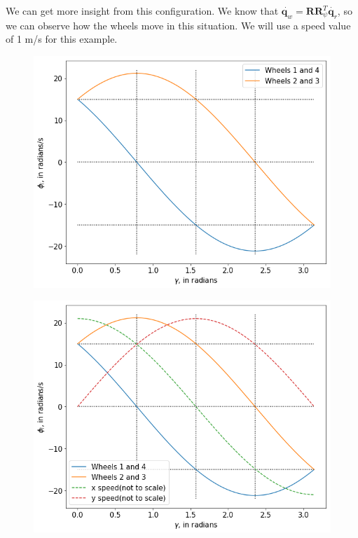\documentclass[12pt]{article}
\renewcommand{\vec}[1]{\bm{#1}}
\newcommand{\R}{\mathbb R}
\def\R{\vec R}
\def\q{\vec q}
\begin{document}
We can get more insight from this configuration. We know that $\dot{\q_w} = \R \R_{\psi}^T \dot{\q_r}$, so we can observe how the wheels move in this situation. We will use a speed value of 1 m/s for this example.
\begin{figure}[h]
	\centering
	\begin{minipage}{.5\textwidth}
		\centering
		\includegraphics[width=.9\linewidth]{wheel_speeds}
		\label{fig:wheel_speed}
	\end{minipage}%
	\begin{minipage}{.5\textwidth}
		\centering
		\includegraphics[width=.9\linewidth]{wheel_xy_speeds}
		\label{fig:wheel_speed_xy}
	\end{minipage}
\end{figure}
\end{document}
